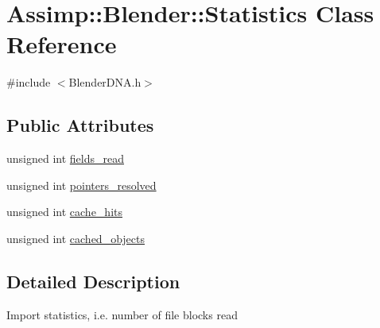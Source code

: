 \hypertarget{class_assimp_1_1_blender_1_1_statistics}{\section{Assimp\+:\+:Blender\+:\+:Statistics Class Reference}
\label{class_assimp_1_1_blender_1_1_statistics}
}


{\ttfamily \#include $<$Blender\+D\+N\+A.\+h$>$}

\subsection*{Public Attributes}
\begin{DoxyCompactItemize}
\item 
unsigned int \hyperlink{class_assimp_1_1_blender_1_1_statistics_adb96a19ae0a9b671d4056408b341dc65}{fields\+\_\+read}
\item 
unsigned int \hyperlink{class_assimp_1_1_blender_1_1_statistics_a16740104345d502ccc24215eb8b3f5c7}{pointers\+\_\+resolved}
\item 
unsigned int \hyperlink{class_assimp_1_1_blender_1_1_statistics_a42c6bff1315c09f78d9b37b1961f53ca}{cache\+\_\+hits}
\item 
unsigned int \hyperlink{class_assimp_1_1_blender_1_1_statistics_ad5ca6adbae251736d4119472fa9dd753}{cached\+\_\+objects}
\end{DoxyCompactItemize}


\subsection{Detailed Description}
Import statistics, i.\+e. number of file blocks read 

